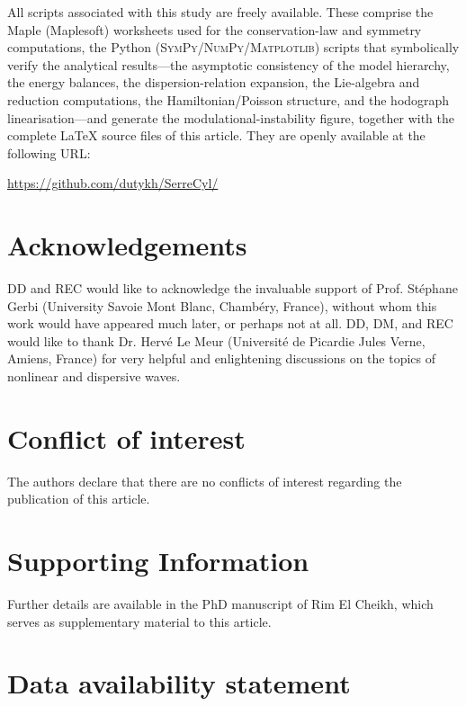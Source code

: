 \documentclass[alpha-refs, 12pt]{wiley-article}
\begin{document}
All scripts associated with this study are freely available. These comprise the Maple (Maplesoft\texttrademark) worksheets used for the conservation-law and symmetry computations, the Python (\textsc{SymPy}/\textsc{NumPy}/\textsc{Matplotlib}) scripts that symbolically verify the analytical results---the asymptotic consistency of the model hierarchy, the energy balances, the dispersion-relation expansion, the Lie-algebra and reduction computations, the Hamiltonian/Poisson structure, and the hodograph linearisation---and generate the modulational-instability figure, together with the complete LaTeX source files of this article. They are openly available at the following URL:

\begin{center}
  \url{https://github.com/dutykh/SerreCyl/}
\end{center}

\section*{Acknowledgements}

DD and REC would like to acknowledge the invaluable support of Prof. St\'ephane Gerbi (University Savoie Mont Blanc, Chamb\'ery, France), without whom this work would have appeared much later, or perhaps not at all. DD, DM, and REC would like to thank Dr. Herv\'e Le Meur (Universit\'e de Picardie Jules Verne, Amiens, France) for very helpful and enlightening discussions on the topics of nonlinear and dispersive waves.

\section*{Conflict of interest}

The authors declare that there are no conflicts of interest regarding the publication of this article.

\section*{Supporting Information}

Further details are available in the PhD manuscript of Rim El Cheikh, which serves as supplementary material to this article.

\section*{Data availability statement}
\end{document}
